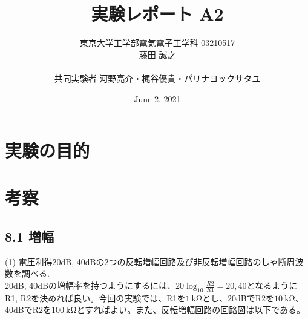 \documentclass{ltjsarticle}
\title{実験レポート A2}
\author{東京大学工学部電気電子工学科 03210517\\藤田 誠之\\~\\ 共同実験者  河野亮介・梶谷優貴・パリナヨックサタユ}
\date{ June 2, 2021}
\begin{document}
\maketitle

\section{実験の目的}

\section{考察}
\subsection*{8.1 増幅}

(1) 電圧利得20dB, 40dBの2つの反転増幅回路及び非反転増幅回路のしゃ断周波数を調べる. \\
20dB, 40dBの増幅率を持つようにするには、$20\log_{10}\frac{R2}{R1} = 20, 40$となるようにR1, R2を決めれば良い。今回の実験では、R1を$\SI{1}{\kilo\ohm}$とし、20dBでR2を$\SI{10}{\kilo\ohm}$、40dBでR2を$\SI{100}{\kilo\ohm}$とすればよい。また、反転増幅回路の回路図は以下である。
\end{document}

